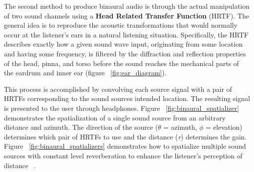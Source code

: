 The second method to produce binaural audio is through the actual manipulation
of two sound channels using a \textbf{Head Related Transfer Function} (HRTF).
The general idea is to reproduce the acoustic transformations that would
normally occur at the listener's ears in a natural listening situation.
Specifically, the HRTF describes exactly how a given sound wave input,
originating from some location and having some frequency, is filtered by the
diffraction and reflection properties of the head, pinna, and torso before the
sound reaches the mechanical parts of the eardrum and inner ear (figure
~\ref{fig:ear_diagram}).


This process is accomplished by convolving each source signal with a pair of
HRTFs corresponding to the sound sources intended location.  The resulting
signal is presented to the user through headphones. Figure
~\ref{fig:binaural_spatializer} demonstrates the spatialization of a single
sound source from an arbitrary distance and azimuth.  The direction of the
source ($\theta$ = azimuth,  $\phi$ = elevation) determines which pair of HRTFs
to use and the distance (\textit{r}) determines the gain.  Figure
~\ref{fig:binaural_spatializers} demonstrates how to spatialize multiple sound
sources with constant level reverberation to enhance the listener's perception
of distance ~\cite{gardner1995transaural}.

